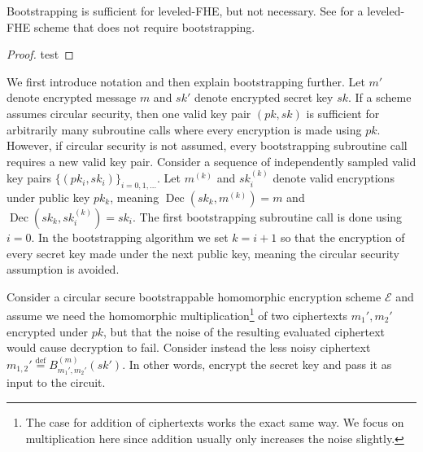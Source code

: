 \begin{remark}
    Bootstrapping is sufficient for leveled-FHE, but not necessary. See \cite{BGV12-no-bootstrap} for a leveled-FHE scheme that does not require bootstrapping.
\end{remark}
\begin{proof}
    test
\end{proof}
We first introduce notation and then explain bootstrapping further. Let $m'$ denote encrypted message $m$ and $sk'$ denote encrypted secret key $sk$. If a scheme assumes circular security, then one valid key pair $(pk,sk)$ is sufficient for arbitrarily many subroutine calls where every encryption is made using $pk$. However, if circular security is not assumed, every bootstrapping subroutine call requires a new valid key pair. Consider a sequence of independently sampled valid key pairs $\{(pk_i,sk_i)\}_{i = 0, 1, \dots}$. Let $m^{(k)}$ and $sk_i^{(k)}$ denote valid encryptions under public key $pk_k$, meaning $\operatorname{Dec}(sk_k,m^{(k)}) = m$ and $\operatorname{Dec}(sk_k,sk_i^{(k)}) = sk_i$. The first bootstrapping subroutine call is done using $i = 0$. In the bootstrapping algorithm we set $k = i+1$ so that the encryption of every secret key made under the next public key, meaning the circular security assumption is avoided. 


Consider a circular secure bootstrappable homomorphic encryption scheme $\mathcal{E}$ and assume we need the homomorphic multiplication\footnote{The case for addition of ciphertexts works the exact same way. We focus on multiplication here since addition usually only increases the noise slightly.} of two ciphertexts $m_1', m_2'$ encrypted under $pk$, but that the noise of the resulting evaluated ciphertext would cause decryption to fail. Consider instead the less noisy ciphertext $m_{1,2}' \stackrel{\mathrm{def}}{=} B_{m_1',m_2'}^{(m)}(sk')$. In other words, encrypt the secret key and pass it as input to the circuit.

